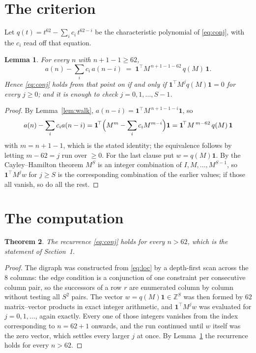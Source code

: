 \documentclass[11pt,a4paper]{article}
\theoremstyle{plain}
\newtheorem{theorem}{Theorem}
\newtheorem{lemma}[theorem]{Lemma}
\theoremstyle{definition}
\begin{document}
\section{The criterion}

Let $q(t)=t^{62}-\sum_i c_i\,t^{62-i}$ be the characteristic polynomial of
\eqref{eq:conj}, with the $c_i$ read off that equation.

\begin{lemma}\label{lem:crit}
For every $n$ with $n+1-1\ge62$,
\[
a(n)-\sum_i c_i\,a(n-i)\;=\;\mathbf{1}^{\!\top}M^{\,n+1-1-62}\,q(M)\,\mathbf{1} .
\]
Hence \eqref{eq:conj} holds from that point on if and only if
$\mathbf{1}^{\!\top}M^{j}q(M)\mathbf{1}=0$ for every $j\ge0$; and it is enough to check
$j=0,1,\dots,S-1$.
\end{lemma}

\begin{proof}
By Lemma~\ref{lem:walk}, $a(n-i)=\mathbf{1}^{\!\top}M^{\,n+1-1-i}\mathbf{1}$, so
\[
a(n)-\sum_i c_i a(n-i)
=\mathbf{1}^{\!\top}\Bigl(M^{m}-\sum_i c_i M^{m-i}\Bigr)\mathbf{1}
=\mathbf{1}^{\!\top}M^{\,m-62}\,q(M)\,\mathbf{1}
\]
with $m=n+1-1$, which is the stated identity; the equivalence follows by letting
$m-62=j$ run over $\ge0$. For the last clause put $w=q(M)\mathbf{1}$. By the
Cayley--Hamilton theorem $M^{S}$ is an integer combination of $I,M,\dots,M^{S-1}$, so
$\mathbf{1}^{\!\top}M^{j}w$ for $j\ge S$ is the corresponding combination of the earlier
values; if those all vanish, so do all the rest.
\end{proof}

\section{The computation}

\begin{theorem}
The recurrence \eqref{eq:conj} holds for every $n>62$, which is the statement of
Section~1.
\end{theorem}

\begin{proof}
The digraph was constructed from \eqref{eq:loc} by a depth-first scan across the $8$
columns: the edge condition is a conjunction of one constraint per consecutive column
pair, so the successors of a row $r$ are enumerated column by column without testing all
$S^2$ pairs. The vector $w=q(M)\mathbf{1}\in\mathbb{Z}^{S}$ was then formed by $62$
matrix--vector products in exact integer arithmetic, and $\mathbf{1}^{\!\top}M^{j}w$ was
evaluated for $j=0,1,\dots$, again exactly. Every one of those integers vanishes from the
index corresponding to $n=62+1$ onwards, and the run continued until $w$ itself was the
zero vector, which settles every larger $j$ at once. By Lemma~\ref{lem:crit} the recurrence
holds for every $n>62$.
\end{proof}
\end{document}
